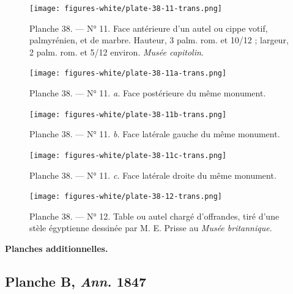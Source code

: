 \documentclass[a4paper, 11pt, oneside, polutonikogreek, french]{article}
\begin{document}
\vspace*{\fill}
\clearpage
\vspace*{\fill}
\begin{figure}[H]
\centering
\texttt{[image: figures-white/plate-38-11-trans.png]}
\caption{\scriptsize Planche 38. --- N° 11. Face antérieure d'un autel ou cippe votif, palmyrénien, et de marbre. Hauteur, 3 palm. rom. et 10/12 ; largeur, 2 palm. rom. et 5/12 environ. \emph{Musée capitolin}.}
\end{figure}
\vspace*{\fill}
\clearpage
\vspace*{\fill}
\begin{figure}[H]
\centering
\texttt{[image: figures-white/plate-38-11a-trans.png]}
\caption{\scriptsize Planche 38. --- N° 11. \emph{a.} Face postérieure du même monument.}
\end{figure}
\vspace*{\fill}
\clearpage
\vspace*{\fill}
\begin{figure}[H]
\centering
\texttt{[image: figures-white/plate-38-11b-trans.png]}
\caption{\scriptsize Planche 38. --- N° 11. \emph{b.} Face latérale gauche du même monument.}
\end{figure}
\vspace*{\fill}
\clearpage
\vspace*{\fill}
\begin{figure}[H]
\centering
\texttt{[image: figures-white/plate-38-11c-trans.png]}
\caption{\scriptsize Planche 38. --- N° 11. \emph{c.} Face latérale droite du même monument.}
\end{figure}
\vspace*{\fill}
\clearpage
\vspace*{\fill}
\begin{figure}[H]
\centering
\texttt{[image: figures-white/plate-38-12-trans.png]}
\caption{\scriptsize Planche 38. --- N° 12. Table ou autel chargé d'offrandes, tiré d'une stèle égyptienne dessinée par M. E. Prisse au \emph{Musée britannique}.}
\end{figure}
\vspace*{\fill}
\clearpage
\pagestyle{plain}
\vspace*{\fill}
\begin{center}
\textbf{Planches additionnelles.}
\end{center}
\subsection{Planche B, \emph{Ann.} 1847}
\end{document}
